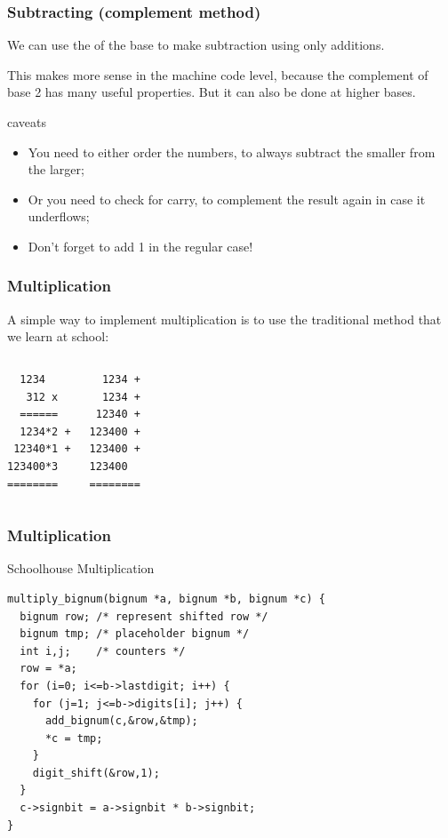 \documentclass{beamer}
\begin{document}
\begin{frame}
  \frametitle{Subtracting (complement method)} 

  We can use the  of the base to make
  subtraction using only additions.

  This makes more sense in the machine code level, because the
  complement of base 2 has many useful properties. But it can also be
  done at higher bases.
  
  \bigskip

  \begin{block}{caveats}
    \begin{itemize}
    \item You need to either order the numbers, to always subtract the
      smaller from the larger;
    \item Or you need to check for carry, to complement the result
      again in case it underflows;
    \item Don't forget to add 1 in the regular case!
    \end{itemize}
  \end{block}
\end{frame}


\begin{frame}
  \frametitle{Multiplication} 

  \begin{block}{}
  A simple way to implement multiplication is to use the traditional
  method that we learn at school:
  \end{block}
  
\begin{columns}[c]
\begin{verbatim}
  1234
   312 x
  ======
  1234*2 +
 12340*1 +
123400*3
========
\end{verbatim}
\begin{verbatim}
  1234 +
  1234 +
 12340 +
123400 +
123400 +
123400
========
\end{verbatim}
\end{columns}
\end{frame}

\begin{frame}
  \frametitle{Multiplication}
  \begin{block}{Schoolhouse Multiplication}
{\smaller
\begin{verbatim}
multiply_bignum(bignum *a, bignum *b, bignum *c) {
  bignum row; /* represent shifted row */
  bignum tmp; /* placeholder bignum */
  int i,j;    /* counters */
  row = *a;
  for (i=0; i<=b->lastdigit; i++) {
    for (j=1; j<=b->digits[i]; j++) {
      add_bignum(c,&row,&tmp);
      *c = tmp;
    }
    digit_shift(&row,1);
  }
  c->signbit = a->signbit * b->signbit;
}
\end{verbatim}}
  \end{block}
\end{frame}
\end{document}
